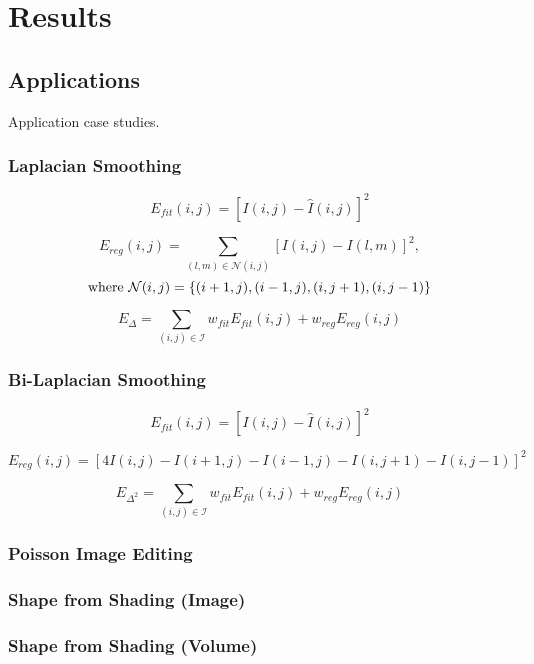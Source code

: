 \section{Results}
\label{sec:results}

\subsection{Applications}
\label{sec:apps}
Application case studies.

\subsubsection{Laplacian Smoothing} 
$$E_{\mathit{fit}}(i,j) = [I(i,j) - \hat{I}(i,j) ]^2$$

$$E_{\mathit{reg}}(i,j) = \sum_{(l,m) \in \mathcal{N}(i,j)} [I(i,j) - I(l,m) ]^2,$$
$$\textnormal{where}\ \mathcal{N}(i,j) = \{(i+1,j), (i-1,j), (i,j+1), (i,j-1)\}$$

$$E_{\Delta} = \sum_{(i,j) \in \mathcal{I}} w_{\mathit{fit}} E_{\mathit{fit}}(i,j) + w_{\mathit{reg}} E_{\mathit{reg}}(i,j)$$

\subsubsection{Bi-Laplacian Smoothing}

$$E_{\mathit{fit}}(i,j) = [I(i,j) - \hat{I}(i,j) ]^2$$

$$E_{\mathit{reg}}(i,j) = [4 I(i,j) - I(i+1,j) - I(i-1,j) - I(i,j+1) - I(i,j-1)]^2$$

$$E_{\Delta^2} = \sum_{(i,j) \in \mathcal{I}} w_{\mathit{fit}} E_{\mathit{fit}}(i,j) + w_{\mathit{reg}} E_{\mathit{reg}}(i,j)$$

\subsubsection{Poisson Image Editing}

\cite{perez2003poisson}

\subsubsection{Shape from Shading (Image)}

\cite{wu2014sfs}

\subsubsection{Shape from Shading (Volume)}

